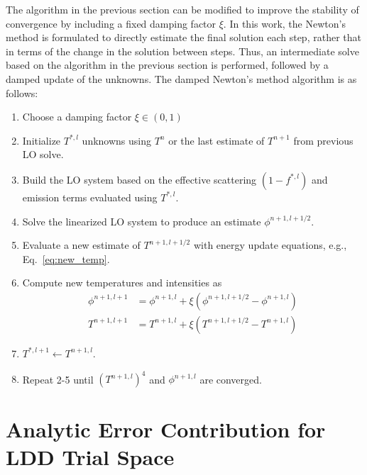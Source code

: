 The algorithm in the previous section can be modified to improve the stability of
convergence by including a fixed damping factor $\xi$.  In this work, the Newton's method is
formulated to directly estimate the final solution each step, rather that in terms of the
change in the solution between steps.  Thus, an intermediate solve based on the algorithm in the previous section is performed, followed by a damped update of the unknowns. 
The damped Newton's method algorithm is as
follows:
\begin{enumerate}
    \item Choose a damping factor $\xi\in(0,1)$
    \item Initialize $T^{*,l}$ unknowns using $T^n$ or the last estimate of $T^{n+1}$ from
        previous LO solve.
    \item  Build the LO system based on the effective scattering $(1-f^{*,l})$ and emission terms
        evaluated using $T^{*,l}$.
    \item Solve the linearized LO system to produce an estimate $\phi^{n+1,l+1/2}$.
    \item Evaluate a new estimate of $T^{n+1,l+1/2}$ with energy update equations, e.g., Eq.~\eqref{eq:new_temp}.
    \item Compute new temperatures and intensities as
        \begin{align*}
            \phi^{n+1,l+1} &= \phi^{n+1,l}+ \xi \left( \phi^{n+1,l+1/2} - \phi^{n+1,l} \right)\\
            T^{n+1,l+1} &= T^{n+1,l}+ \xi \left( T^{n+1,l+1/2} - T^{n+1,l} \right)
           \end{align*}
    \item $T^{*,l+1}\leftarrow{T}^{n+1,l}$.
    \item Repeat 2-5 until $(T^{n+1,l})^4$ and $\phi^{n+1,l}$ are converged.
\end{enumerate}


\section{Analytic Error Contribution for LDD Trial Space}
\label{sec:face_err_deriv}

